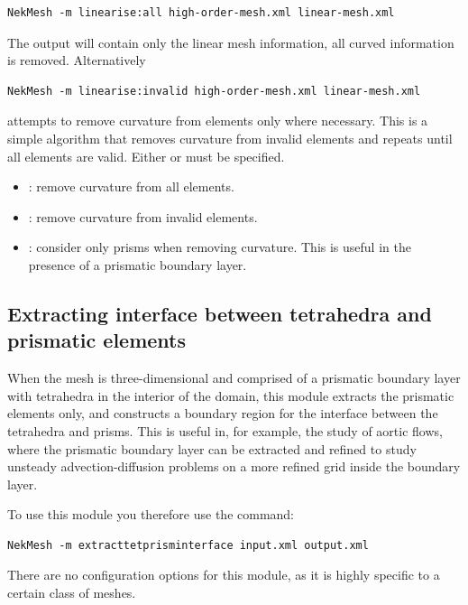 \begin{lstlisting}[style=BashInputStyle]
  NekMesh -m linearise:all high-order-mesh.xml linear-mesh.xml
\end{lstlisting}

The output will contain only the linear mesh information, all curved information
is removed. Alternatively

\begin{lstlisting}[style=BashInputStyle]
  NekMesh -m linearise:invalid high-order-mesh.xml linear-mesh.xml
\end{lstlisting}

attempts to remove curvature from elements only where necessary. This is a
simple algorithm that removes curvature from invalid elements and repeats until
all elements are valid. Either  or  must be specified.

\begin{itemize}
  \item {}: remove curvature from all elements.
  \item {}: remove curvature from invalid elements.
  \item {}: consider only prisms when removing curvature. This is
  useful in the presence of a prismatic boundary layer.
\end{itemize}

\subsection{Extracting interface between tetrahedra and prismatic elements}

When the mesh is three-dimensional and comprised of a prismatic boundary layer
with tetrahedra in the interior of the domain, this module extracts the
prismatic elements only, and constructs a boundary region for the interface
between the tetrahedra and prisms. This is useful in, for example, the study of
aortic flows, where the prismatic boundary layer can be extracted and refined to
study unsteady advection-diffusion problems on a more refined grid inside the
boundary layer.

To use this module you therefore use the command:

\begin{lstlisting}[style=BashInputStyle]
  NekMesh -m extracttetprisminterface input.xml output.xml
\end{lstlisting}

There are no configuration options for this module, as it is highly specific to
a certain class of meshes.


